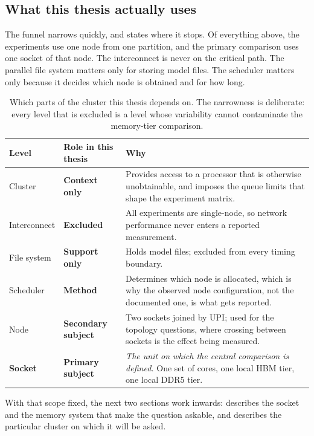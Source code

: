 \subsection{What this thesis actually uses}

The funnel narrows quickly, and  states where it
stops.  Of everything above, the experiments use one node from one
partition, and the primary comparison uses one socket of that node.  The
interconnect is never on the critical path.  The parallel file system
matters only for storing model files.  The scheduler matters only
because it decides which node is obtained and for how long.

\begin{table}[htbp]
\centering
\small
\tabsetup
\caption{Which parts of the cluster this thesis depends on.  The
narrowness is deliberate: every level that is excluded is a level whose
variability cannot contaminate the memory-tier comparison.}
\label{tab:hpc-scope}
\begin{tabularx}{\textwidth}{@{}P{3.05cm}P{3.3cm}Y@{}}
\toprule
\headrow
\textbf{Level} & \textbf{Role in this thesis} & \textbf{Why} \\
\midrule
Cluster
& \textbf{Context only}
& Provides access to a processor that is otherwise unobtainable, and
  imposes the queue limits that shape the experiment matrix. \\
\addlinespace[1pt]
Interconnect
& \textbf{Excluded}
& All experiments are single-node, so network performance never enters
  a reported measurement. \\
\addlinespace[1pt]
File system
& \textbf{Support only}
& Holds model files; excluded from every timing boundary. \\
\addlinespace[1pt]
Scheduler
& \textbf{Method}
& Determines which node is allocated, which is why the observed node
  configuration, not the documented one, is what gets reported. \\
\addlinespace[1pt]
Node
& \textbf{Secondary subject}
& Two sockets joined by UPI; used for the topology questions, where
  crossing between sockets is the effect being measured. \\
\addlinespace[1pt]
\textbf{Socket}
& \textbf{Primary subject}
& \emph{The unit on which the central comparison is defined.}  One set
  of cores, one local HBM tier, one local DDR5 tier. \\
\bottomrule
\end{tabularx}
\end{table}

With that scope fixed, the next two sections work inwards:
 describes the socket and the memory
system that make the question askable, and 
describes the particular cluster on which it will be asked.
